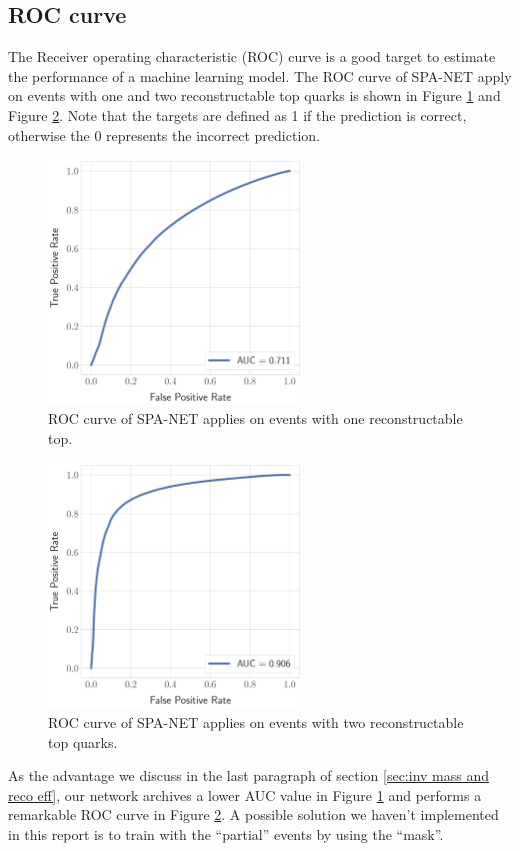 \subsection{ROC curve}\label{sebsec:roc}
The Receiver operating characteristic (ROC) curve is a good target to estimate the performance of a machine learning model. The ROC curve of SPA-NET apply on events with one and two reconstructable top quarks is shown in Figure \ref{fig: roc one top} and Figure \ref{fig: roc two top}. Note that the targets are defined as 1 if the prediction is correct, otherwise the 0 represents the incorrect prediction.
\\
 \begin{figure}[H]
 	\centering
 	\includegraphics[width=0.6\textwidth]{Figures/roc_one_quark.pdf}
 	\caption{ ROC curve of SPA-NET applies on events with one reconstructable top.}
 	\label{fig: roc one top}
 \end{figure}
 \begin{figure}[H]
 	\centering
 	\includegraphics[width=0.6\textwidth]{Figures/roc_two_quark.pdf}
 	\caption{ ROC curve of SPA-NET applies on events with two reconstructable top quarks.}
 	\label{fig: roc two top}
 \end{figure}
\newpage
As the advantage we discuss in the last paragraph of section \ref{sec:inv mass and reco eff}, our network archives a lower AUC value in Figure \ref{fig: roc one top} and performs a remarkable ROC curve in Figure \ref{fig: roc two top}. A possible solution we haven't implemented in this report is to train with the ``partial'' events by using the ``mask''.\cite{Fenton:2020woz}\cite{Shmakov:2021qdz}
